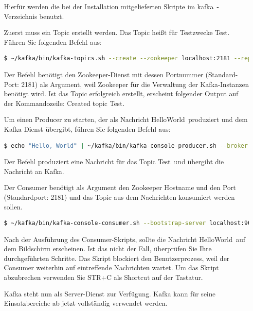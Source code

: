 \documentclass[a4paper,titlepage,halfparskip,12pt]{scrreprt}
\begin{document}
\begin{onehalfspacing}
Hierfür werden die bei der Installation mitgelieferten Skripte im \glqq kafka\grqq\ -Verzeichnis benutzt.

Zuerst muss ein Topic erstellt werden. Das Topic heißt für Testzwecke \glqq Test\grqq.  Führen Sie folgenden Befehl aus:

\smallskip

\begin{lstlisting}[language=Bash]
$ ~/kafka/bin/kafka-topics.sh --create --zookeeper localhost:2181 --replication-factor 1 --partitions 1 --topic Test
\end{lstlisting}

Der Befehl benötigt den Zookeeper-Dienst mit dessen Portnummer (Standard-Port: 2181) als Argument, weil Zookeeper für die Verwaltung der Kafka-Instanzen benötigt wird. Ist das Topic erfolgreich erstellt, erscheint folgender Output auf der Kommandozeile: \glqq Created topic Test\grqq.

Um einen Producer zu starten, der als Nachricht \glqq HelloWorld\grqq\ produziert und dem Kafka-Dienst übergibt, führen Sie folgenden Befehl aus:

\smallskip

\begin{lstlisting}[language=Bash]
$ echo "Hello, World" | ~/kafka/bin/kafka-console-producer.sh --broker-list localhost:9092 --topic Test > /dev/null
\end{lstlisting}

Der Befehl produziert eine Nachricht für das Topic \glqq Test\grqq\ und übergibt die Nachricht an Kafka.

Der Consumer benötigt als Argument den Zookeeper Hostname und den Port (Standardport: 2181) und das Topic aus dem Nachrichten konsumiert werden sollen.

\smallskip

\begin{lstlisting}[language=Bash]
$ ~/kafka/bin/kafka-console-consumer.sh --bootstrap-server localhost:9092 --topic Test --from-beginning
\end{lstlisting}

Nach der Ausführung des Consumer-Skripts, sollte die Nachricht \glqq HelloWorld\grqq\ auf dem Bildschirm erscheinen. Ist das nicht der Fall, überprüfen Sie Ihre durchgeführten Schritte. Das Skript blockiert den Benutzerprozess, weil der Consumer weiterhin auf eintreffende Nachrichten wartet. Um das Skript abzubrechen verwenden Sie STR+C als Shortcut auf der Tastatur.

Kafka steht nun als Server-Dienst zur Verfügung. Kafka kann für seine Einsatzbereiche ab jetzt vollständig verwendet werden.


\end{onehalfspacing}
\end{document}
